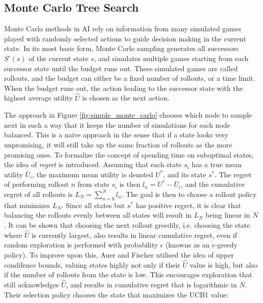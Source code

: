 

\newpage
\subsection{Monte Carlo Tree Search}

Monte Carlo methods in AI rely on information from many simulated games played with randomly selected actions to guide decision making in the current state. In its most basic form, Monte Carlo sampling generates all successors $S'(s)$ of the current state $s$, and simulates multiple games starting from each successor state until the budget runs out. These simulated games are called rollouts, and the budget can either be a fixed number of rollouts, or a time limit. When the budget runs out, the action leading to the successor state with the highest average utility $\hat{U}$ is chosen as the next action.



The approach in Figure \ref{fig:simple_monte_carlo} chooses which node to sample next in such a way that it keeps the number of simulations for each node balanced. This is a naive approach in the sense that if a state looks very unpromising, it will still take up the same fraction of rollouts as the more promising ones. To formalize the concept of spending time on suboptimal states, the idea of \textit{regret} is introduced. Assuming that each state $s_i$ has a true mean utility $\bar{U}_i$, the maximum mean utility is denoted $U^*$, and its state $s^*$. The regret of performing rollout $n$ from state $s_i$ is then $l_n = U^* - \bar{U}_i$, and the cumulative regret of all rollouts is $L_N = \sum_{n=0}^N l_n$. The goal is then to choose a rollout policy that minimizes $L_N$. Since all states but $s^*$ has positive regret, it is clear that balancing the rollouts evenly between all states will result in $L_N$ being linear in $N$. It can be shown that choosing the next rollout greedily, i.e. choosing the state where $\hat{U}$ is currently largest, also results in linear cumulative regret, even if random exploration is performed with probability $\epsilon$ (knowns as an $\epsilon$-greedy policy).
To improve upon this, Auer and Fischer \cite{Auer2002} utilised the idea of upper condifence bounds, valuing states highly not only if their $\hat{U}$ value is high, but also if the number of rollouts from the state is low. This encourages exploration that still acknowledges $\hat{U}$, and results in cumulative regret that is logarithmic in $N$. Their selection policy chooses the state that maximizes the UCB1 value:

